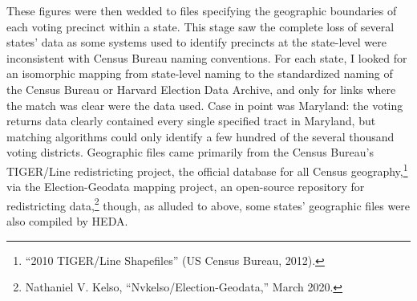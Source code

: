\documentclass[12pt,oneside]{psthesis}
\begin{document}
These figures were then wedded to files specifying the geographic boundaries of each voting precinct within a state.
This stage saw the complete loss of several states' data as some systems used to identify precincts at the state-level were inconsistent with Census Bureau naming conventions.
For each state, I looked for an isomorphic mapping from state-level naming to the standardized naming of the Census Bureau or Harvard Election Data Archive, and only for links where the match was clear were the data used.
Case in point was Maryland: the voting returns data clearly contained every single specified tract in Maryland, but matching algorithms could only identify a few hundred of the several thousand voting districts.
Geographic files came primarily from the Census Bureau's TIGER/Line redistricting project, the official database for all Census geography,\footnote{``2010 TIGER/Line Shapefiles'' (US Census Bureau, 2012).} via the Election-Geodata mapping project, an open-source repository for redistricting data,\footnote{Nathaniel V. Kelso, ``Nvkelso/Election-Geodata,'' March 2020.} though, as alluded to above, some states' geographic files were also compiled by HEDA.
\end{document}
